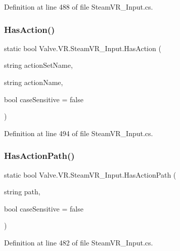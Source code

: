 Definition at line 488 of file Steam\+V\+R\+\_\+\+Input.\+cs.

\mbox{\label{class_valve_1_1_v_r_1_1_steam_v_r___input_a04fc7868c6a4a357bc5f313a8b9096bf}} 
\subsubsection{\texorpdfstring{HasAction()}{HasAction()}\hspace{0.1cm}{\footnotesize\ttfamily [2/2]}}
{\footnotesize\ttfamily static bool Valve.\+V\+R.\+Steam\+V\+R\+\_\+\+Input.\+Has\+Action (\begin{DoxyParamCaption}\item[{string}]{action\+Set\+Name,  }\item[{string}]{action\+Name,  }\item[{bool}]{case\+Sensitive = {\ttfamily false} }\end{DoxyParamCaption})\hspace{0.3cm}{\ttfamily [static]}}



Definition at line 494 of file Steam\+V\+R\+\_\+\+Input.\+cs.

\mbox{\label{class_valve_1_1_v_r_1_1_steam_v_r___input_aa27da7ef81397ed3fb0e6ef12e13a2c7}} 
\subsubsection{\texorpdfstring{HasActionPath()}{HasActionPath()}}
{\footnotesize\ttfamily static bool Valve.\+V\+R.\+Steam\+V\+R\+\_\+\+Input.\+Has\+Action\+Path (\begin{DoxyParamCaption}\item[{string}]{path,  }\item[{bool}]{case\+Sensitive = {\ttfamily false} }\end{DoxyParamCaption})\hspace{0.3cm}{\ttfamily [static]}}



Definition at line 482 of file Steam\+V\+R\+\_\+\+Input.\+cs.

